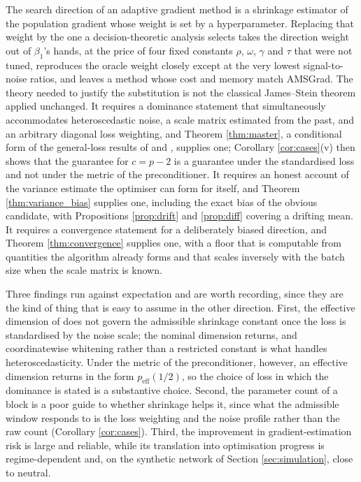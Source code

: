 \documentclass[a4paper,fleqn]{cas-dc}
\theoremstyle{plain}
\theoremstyle{definition}
\theoremstyle{remark}
\newcommand{\rev}[1]{#1}
\newcommand{\peffq}[1]{p_{\mathrm{eff}}(#1)}
\begin{document}
The search direction of an adaptive gradient method is a shrinkage estimator of the population gradient whose weight is set by a hyperparameter. Replacing that weight by the one a decision-theoretic analysis selects \rev{takes the direction weight out of $\beta_1$'s hands, at the price of four fixed constants $\rho$, $\omega$, $\gamma$ and $\tau$ that were not tuned}, reproduces the oracle weight closely except at the very lowest signal-to-noise ratios, and leaves a method whose cost and memory match AMSGrad. The theory needed to justify the substitution is not the classical James--Stein theorem applied unchanged. It requires a dominance statement that simultaneously accommodates heteroscedastic noise, a scale matrix estimated from the past, and \rev{an arbitrary diagonal loss weighting, and Theorem \ref{thm:master}, a conditional form of the general-loss results of \citet{bock1975} and \citet{berger1976jmva}, supplies one; Corollary \ref{cor:cases}(v) then shows that the guarantee for $c=p-2$ is a guarantee under the standardised loss and not under the metric of the preconditioner.} It requires an honest account of the variance estimate the optimiser can form for itself, and Theorem \ref{thm:variance_bias} supplies one, including the exact bias of the obvious candidate\rev{, with Propositions \ref{prop:drift} and \ref{prop:diff} covering a drifting mean}. It requires a convergence statement for a deliberately biased direction, and Theorem \ref{thm:convergence} supplies one, with a floor that is computable from quantities the algorithm already forms and that scales inversely with the batch size\rev{ when the scale matrix is known}.

Three findings run against expectation and are worth recording, since they are the kind of thing that is easy to assume in the other direction. First, the effective dimension of \citet{bock1975} does not govern the admissible shrinkage constant once the loss is standardised by the noise scale; the nominal dimension returns, and coordinatewise whitening rather than a restricted constant is what handles heteroscedasticity\rev{. Under the metric of the preconditioner, however, an effective dimension returns in the form $\peffq{1/2}$, so the choice of loss in which the dominance is stated is a substantive choice}. Second, the parameter count of a block is a poor guide to whether shrinkage helps it, since what the admissible window responds to is the loss weighting and the noise profile rather than the raw count (Corollary \ref{cor:cases}). Third, the improvement in gradient-estimation risk is large and reliable, while its translation into optimisation progress is regime-dependent and, on the synthetic network of Section \ref{sec:simulation}, close to neutral.
\end{document}
